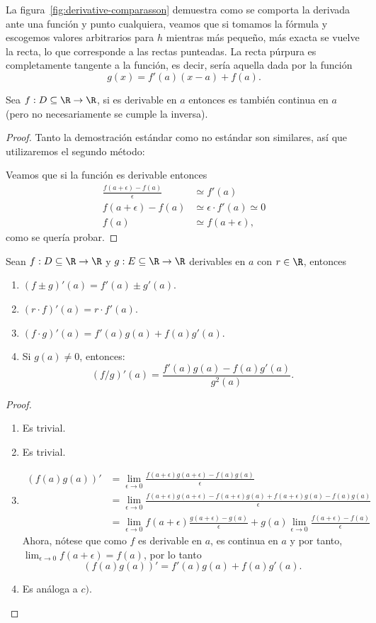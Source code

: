 \documentclass[11pt,oneside,a4paper]{book}
\begin{document}
La figura~\ref{fig:derivative-comparasson} demuestra como se comporta la derivada ante una función y punto cualquiera, veamos que si tomamos la fórmula y escogemos valores arbitrarios para $h$ mientras más pequeño, más exacta se vuelve la recta, lo que corresponde a las rectas punteadas. La recta púrpura es completamente tangente a la función, es decir, sería aquella dada por la función
$$g(x)=f'(a)(x-a)+f(a).$$
\begin{thm}
Sea $f:D\subseteq\R\rightarrow\R$, si es derivable en $a$ entonces es también continua en $a$ (pero no necesariamente se cumple la inversa).
\end{thm}
\begin{proof}
Tanto la demostración estándar como no estándar son similares, así que utilizaremos el segundo método:

Veamos que si la función es derivable entonces
\begin{align*}
\frac{f(a+\epsilon)-f(a)}{\epsilon}&\simeq f'(a)\\
f(a+\epsilon)-f(a)&\simeq\epsilon\cdot f'(a)\simeq 0\\
f(a)&\simeq f(a+\epsilon),
\end{align*}
como se quería probar.
\end{proof}
\begin{thm}
Sean $f:D\subseteq\R\rightarrow\R$ y $g:E\subseteq\R\rightarrow\R$ derivables en $a$ con $r\in\R$, entonces
\begin{enumerate}[$a)$]
\item $(f\pm g)'(a)=f'(a)\pm g'(a)$.
\item $(r\cdot f)'(a)=r\cdot f'(a)$.
\item $(f\cdot g)'(a)=f'(a)g(a)+f(a)g'(a)$.
\item Si $g(a)\neq 0$, entonces:
$$(f/g)'(a)=\frac{f'(a)g(a)-f(a)g'(a)}{g^2(a)}.$$
\end{enumerate}
\end{thm}
\begin{proof}
\begin{enumerate}[$a)$]
\item Es trivial.
\item Es trivial.
\item
\begin{align*}
(f(a)g(a))'&=\lim_{\epsilon\to 0}\frac{f(a+\epsilon)g(a+\epsilon)-f(a)g(a)}{\epsilon}\\
&=\lim_{\epsilon\to 0}\frac{f(a+\epsilon)g(a+\epsilon)-f(a+\epsilon)g(a)+f(a+\epsilon)g(a)-f(a)g(a)}{\epsilon}\\
&=\lim_{\epsilon\to 0}f(a+\epsilon)\frac{g(a+\epsilon)-g(a)}{\epsilon}+g(a)\lim_{\epsilon\to 0}\frac{f(a+\epsilon)-f(a)}{\epsilon}
\end{align*}
Ahora, nótese que como $f$ es derivable en $a$, es continua en $a$ y por tanto, $\lim_{\epsilon\to 0}f(a+\epsilon)=f(a)$, por lo tanto
$$(f(a)g(a))'=f'(a)g(a)+f(a)g'(a).$$
\item Es análoga a $c)$.
\end{enumerate}
\end{proof}
\end{document}
